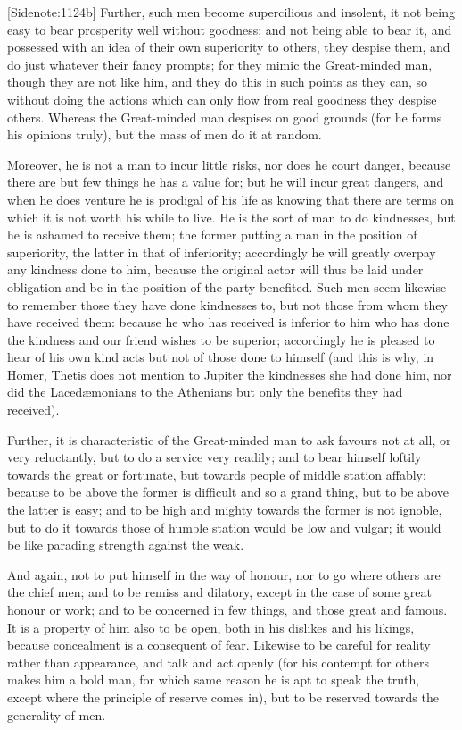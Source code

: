 [Sidenote:1124b] Further, such men become supercilious and insolent, it
not being easy to bear prosperity well without goodness; and not being
able to bear it, and possessed with an idea of their own superiority to
others, they despise them, and do just whatever their fancy prompts; for
they mimic the Great-minded man, though they are not like him, and they
do this in such points as they can, so without doing the actions which
can only flow from real goodness they despise others. Whereas the
Great-minded man despises on good grounds (for he forms his opinions
truly), but the mass of men do it at random.

Moreover, he is not a man to incur little risks, nor does he court
danger, because there are but few things he has a value for; but he will
incur great dangers, and when he does venture he is prodigal of his life
as knowing that there are terms on which it is not worth his while to
live. He is the sort of man to do kindnesses, but he is ashamed to
receive them; the former putting a man in the position of superiority,
the latter in that of inferiority; accordingly he will greatly overpay
any kindness done to him, because the original actor will thus be laid
under obligation and be in the position of the party benefited. Such men
seem likewise to remember those they have done kindnesses to, but not
those from whom they have received them: because he who has received is
inferior to him who has done the kindness and our friend wishes to be
superior; accordingly he is pleased to hear of his own kind acts but not
of those done to himself (and this is why, in Homer, Thetis does
not mention to Jupiter the kindnesses she had done him, nor did the
Lacedæmonians to the Athenians but only the benefits they had received).

Further, it is characteristic of the Great-minded man to ask favours not
at all, or very reluctantly, but to do a service very readily; and to
bear himself loftily towards the great or fortunate, but towards people
of middle station affably; because to be above the former is difficult
and so a grand thing, but to be above the latter is easy; and to be high
and mighty towards the former is not ignoble, but to do it towards those
of humble station would be low and vulgar; it would be like parading
strength against the weak.

And again, not to put himself in the way of honour, nor to go where
others are the chief men; and to be remiss and dilatory, except in the
case of some great honour or work; and to be concerned in few things,
and those great and famous. It is a property of him also to be open,
both in his dislikes and his likings, because concealment is a
consequent of fear. Likewise to be careful for reality rather than
appearance, and talk and act openly (for his contempt for others makes
him a bold man, for which same reason he is apt to speak the truth,
except where the principle of reserve comes in), but to be reserved
towards the generality of men.

